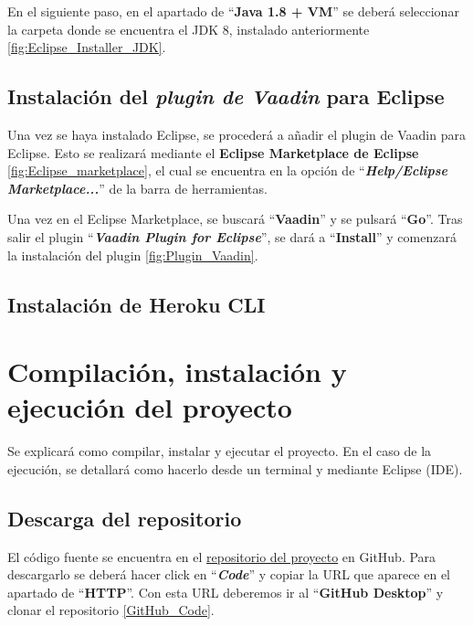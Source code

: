En el siguiente paso, en el apartado de ``\textbf{Java 1.8 + VM}'' se deberá seleccionar la carpeta donde se encuentra el JDK 8, instalado anteriormente \ref{fig:Eclipse_Installer_JDK}.


\subsection{Instalación del \textit{plugin de Vaadin} para Eclipse}
Una vez se haya instalado Eclipse, se procederá a añadir el plugin de Vaadin para Eclipse. Esto se realizará mediante el \textbf{Eclipse Marketplace de Eclipse} \ref{fig:Eclipse_marketplace}, el cual se encuentra en la opción de ``\textbf{\textit{Help/Eclipse Marketplace...}}'' de la barra de herramientas.


Una vez en el Eclipse Marketplace, se buscará ``\textbf{Vaadin}'' y se pulsará ``\textbf{Go}''. Tras salir el plugin ``\textbf{\textit{Vaadin Plugin for Eclipse}}'', se dará a ``\textbf{Install}'' y comenzará la instalación del plugin \ref{fig:Plugin_Vaadin}.


\subsection{Instalación de Heroku CLI}

\section{Compilación, instalación y ejecución del proyecto}
Se explicará como compilar, instalar y ejecutar el proyecto. En el caso de la ejecución, se detallará como hacerlo desde un terminal y mediante Eclipse (IDE).

\subsection{Descarga del repositorio}
El código fuente se encuentra en el \href{https://github.com/dbo1001/Gestor-TFG-2021}{repositorio del proyecto} en GitHub. Para descargarlo se deberá hacer click en ``\textbf{\textit{Code}}'' y copiar la URL que aparece en el apartado de ``\textbf{HTTP}''. Con esta URL deberemos ir al ``\textbf{GitHub Desktop}'' y clonar el repositorio \ref{GitHub_Code}.

